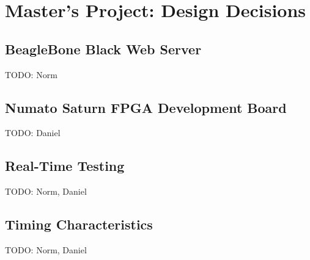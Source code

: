 \section{Master's Project: Design Decisions}

\subsection{BeagleBone Black Web Server}
TODO: Norm
\subsection{Numato Saturn FPGA Development Board}
TODO: Daniel
\subsection{Real-Time Testing}
TODO: Norm, Daniel
\subsection{Timing Characteristics}
TODO: Norm, Daniel
\newpage